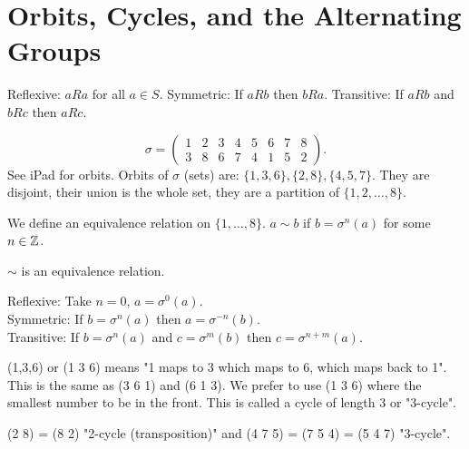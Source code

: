 \documentclass[class=article,crop=false]{standalone}
\begin{document}
\section{Orbits, Cycles, and the Alternating Groups}

\begin{note}
Reflexive: $ aRa$ for all  $ a \in S$.
Symmetric: If $ aRb$ then  $ bRa$.
Transitive: If  $ aRb$ and  $ bRc$ then  $ aRc$.
\end{note}

\begin{eg}[]
\[
	\sigma= \begin{pmatrix} 1&2&3&4&5&6&7&8\\3&8&6&7&4&1&5&2 \end{pmatrix} 
.\] 
See iPad for orbits.
Orbits of $ \sigma$ (sets) are: $ \{1,3,6\},\{2,8\} ,\{4,5,7\}  $. They are disjoint, their union is the whole set, they are a partition of $ \{1,2,\ldots,8\} $.
\end{eg}
\begin{defn}[]
	We define an equivalence relation on $ \{1,\ldots,8\} $. $ a\sim b$ if  $ b= \sigma^{n}(a)$ for some $n \in \mathbb{Z}$.
\end{defn}

\begin{claim}[]
$ \sim$ is an equivalence relation.
\end{claim}
\begin{prf}
	Reflexive: Take $ n=0$,  $ a = \sigma^{0}(a)$.\\
	Symmetric: If $ b= \sigma^{n}(a)$ then $ a = \sigma^{-n}(b)$.\\
	Transitive: If $ b = \sigma^{n}(a)$ and $ c= \sigma^{m}(b)$ then $ c= \sigma^{n+m}(a)$.
\end{prf}

\begin{notation}[cycles]
	(1,3,6) or (1 3 6) means "1 maps to 3 which maps to 6, which maps back to 1". This is the same as (3 6 1) and (6 1 3). We prefer to use (1 3 6) where the smallest number to be in the front. This is called a cycle of length 3 or "3-cycle".
\end{notation}

\begin{eg}
	(2 8) = (8 2) "2-cycle (transposition)" and (4 7 5) = (7 5 4) = (5 4 7) "3-cycle". 
\end{eg}
\end{document}
